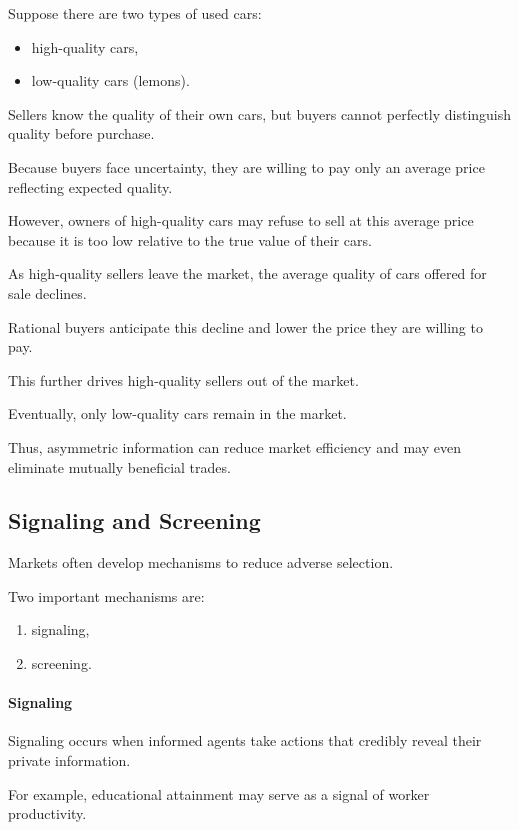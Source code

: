 Suppose there are two types of used cars:

\begin{itemize}
    \item high-quality cars,
    \item low-quality cars (lemons).
\end{itemize}

Sellers know the quality of their own cars, but buyers cannot perfectly distinguish quality before purchase.

Because buyers face uncertainty, they are willing to pay only an average price reflecting expected quality.

However, owners of high-quality cars may refuse to sell at this average price because it is too low relative to the true value of their cars.

As high-quality sellers leave the market, the average quality of cars offered for sale declines.

Rational buyers anticipate this decline and lower the price they are willing to pay.

This further drives high-quality sellers out of the market.

Eventually, only low-quality cars remain in the market.

Thus, asymmetric information can reduce market efficiency and may even eliminate mutually beneficial trades.

\subsection{Signaling and Screening}

Markets often develop mechanisms to reduce adverse selection.

Two important mechanisms are:

\begin{enumerate}
    \item signaling,
    \item screening.
\end{enumerate}

\paragraph{Signaling}

Signaling occurs when informed agents take actions that credibly reveal their private information.

For example, educational attainment may serve as a signal of worker productivity.

